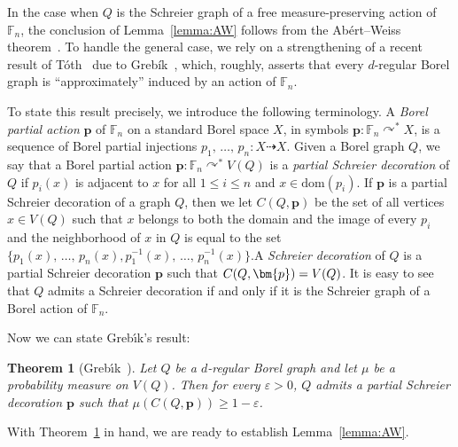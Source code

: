\documentclass[10pt]{amsart}
\newtheorem{theo}[cdrthm]{Theorem}
\theoremstyle{definition}
\newcommand{\0}{\varnothing}
\newcommand{\set}[1]{\{#1\}}
\renewcommand{\epsilon}{\varepsilon}
\renewcommand{\leq}{\leqslant}
\renewcommand{\geq}{\geqslant}
\newcommand{\pto}{\dashrightarrow}
\newcommand{\F}{\mathbb{F}}
\newcommand{\dom}{\mathrm{dom}}
\begin{document}
In the case when $Q$ is the Schreier graph of a free measure-preserving action of $\F_n$, the conclusion of Lemma~\ref{lemma:AW} follows from the Abért--Weiss theorem~\cite{AW}. To handle the general case, we rely on a strengthening of a recent result of Tóth~\cite{Toth} due to Greb\'ik~\cite{Jan}, which, roughly, asserts that every $d$-regular Borel graph is ``approximately'' induced by an action of $\F_n$.


To state this result precisely, we introduce the following terminology. A \emph{Borel partial action} $\bm{p}$ of $\F_n$ on a standard Borel space $X$, in symbols $\bm{p} \colon \F_n \curvearrowright^\ast X$, is a sequence of Borel partial injections $p_1,\,\ldots,\, p_n \colon X \pto X$. Given a Borel graph $Q$, we say that a Borel partial action $\bm{p} \colon \F_n \curvearrowright^\ast V(Q)$ is a \emph{partial Schreier decoration} of $Q$ if $p_i(x)$ is adjacent to $x$ for all $1 \leq i \leq n$ and $x \in \dom(p_i)$. If $\bm{p}$ is a partial Schreier decoration of a graph $Q$, then we let $C(Q, \bm{p})$ be the set of all vertices $x \in V(Q)$ such that $x$ belongs to both the domain and the image of every $p_i$ and the neighborhood of $x$ in $Q$ is equal to the set $\set{p_1(x),\, \ldots,\, p_n(x), p^{-1}_1(x), \,\ldots,\, p_n^{-1}(x)}$.\linebreak A \emph{Schreier decoration} of $Q$ is a partial Schreier decoration $\bm{p}$ such that $C(Q, \bm{p})\linebreak = V(Q)$. It is easy to see that $Q$ admits a Schreier decoration if and only if it is the Schreier graph of a Borel action of $\F_n$.

Now we can state Greb{\'\i}k's result:

\begin{theo}[{Greb{\'\i}k~\cite[Theorem~0.2(III)]{Jan}}]\label{theo:Jan}
Let $Q$ be a $d$-regular Borel graph and let $\mu$ be a probability measure on $V(Q)$. Then for every $\epsilon > 0$, $Q$ admits a partial Schreier decoration $\bm{p}$ such that $\mu(C(Q, \bm{p})) \geq 1 - \epsilon$.
\end{theo}

With Theorem~\ref{theo:Jan} in hand, we are ready to establish Lemma~\ref{lemma:AW}.
\end{document}
